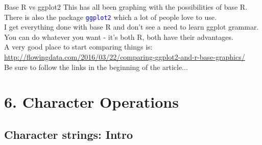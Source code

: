 \documentclass[xcolor=table,       handout,    xcolor=dvipsnames]{beamer}\usepackage[]{graphicx}\usepackage[]{color}
\newcommand{\rcode}[1]{\texttt{\textcolor{Blue}{#1}}} %
\begin{document}
\begin{frame}[fragile]{Base R vs ggplot2}
This has all been graphing with the possibilities of base R.\\
There is also the package \rcode{ggplot2} which a lot of people love to use.\\
I get everything done with base R and don't see a need to learn ggplot grammar.\\
You can do whatever you want - it's both R, both have their advantages.\\
A very good place to start comparing things is:\\
\url{http://flowingdata.com/2016/03/22/comparing-ggplot2-and-r-base-graphics/}\\
Be sure to follow the links in the beginning of the article...
\end{frame}

\section{6. Character Operations}

\subsection{Character strings: Intro}
\end{document}
